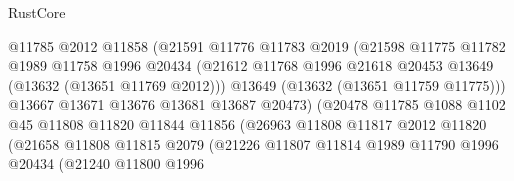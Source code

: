 \begin{lexlean}{RustCore}
\begin{coremodule}
                                  @11785
                                  @2012
                                  @11858
                                  (@21591
                                    @11776
                                    @11783
                                    @2019
                                    (@21598
                                      @11775
                                      @11782
                                      @1989
                                      @11758
                                      @1996
                                      @20434
                                      (@21612
                                        @11768
                                        @1996
                                        @21618
                                        @20453
                                        @13649
                                        (@13632 (@13651 @11769 @2012)))
                                      @13649
                                      (@13632 (@13651 @11759 @11775)))
                                    @13667
                                    @13671
                                    @13676
                                    @13681
                                    @13687
                                    @20473)
                                  (@20478
                                    @11785
                                    @1088
                                    @1102
                                    @45
                                    @11808
                                    @11820
                                    @11844
                                    @11856
                                    (@26963
                                      @11808
                                      @11817
                                      @2012
                                      @11820
                                      (@21658
                                        @11808
                                        @11815
                                        @2079
                                        (@21226
                                          @11807
                                          @11814
                                          @1989
                                          @11790
                                          @1996
                                          @20434
                                          (@21240
                                            @11800
                                            @1996

\end{coremodule}
\end{lexlean}
